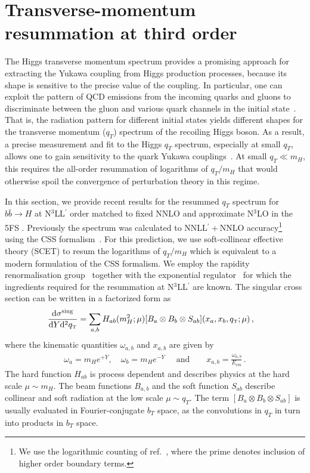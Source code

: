 \documentclass[11pt,a4paper]{article}
\begin{document}
\section{Transverse-momentum resummation at third order}
\label{sec:resummation}
The Higgs transverse momentum spectrum provides a promising approach for extracting the Yukawa coupling from Higgs production processes, because its shape is sensitive to the precise value of the coupling.
In particular, one can exploit the pattern of QCD emissions from the incoming quarks and gluons to discriminate between the gluon and various quark channels in the initial state~\cite{Ebert:2016idf}.
That is, the radiation pattern for different initial states yields different shapes for the transverse momentum ($q_T$) spectrum of the recoiling Higgs boson. As a result, a precise measurement and fit to the Higgs $q_T$ spectrum, especially at small $q_T$, allows one to gain sensitivity to the quark Yukawa couplings~\cite{Bishara:2016jga, Soreq:2016rae}.
At small $q_T \ll m_H$,
this requires the all-order resummation of logarithms of $q_T/m_H$ that would
otherwise spoil the convergence of perturbation theory in this regime.

In this section, we provide recent results for the resummed $q_T$ spectrum for $b\bar{b}\to H$ at N$^3$LL$^{\prime}$ order matched to fixed NNLO and approximate N$^3$LO in the 5FS \cite{Cal:2023mib}. Previously the spectrum was calculated to NNLL$^{\prime}+$NNLO accuracy\footnote{We use the logarithmic counting of ref.~\cite{Berger:2010xi}, where the prime denotes inclusion of higher order boundary terms.} ~\cite{Harlander:2014hya} using the CSS formalism~\cite{Collins:1981uk,Collins:1981va, Collins:1984kg}. For this prediction, we use soft-collinear effective theory (SCET)
\cite{Bauer:2000yr,Bauer:2001ct,Bauer:2001yt,Bauer:2002nz,Beneke:2002ph} to resum the logarithms of $q_T/m_H$ which is equivalent to a modern formulation of the CSS formalism.
We employ the rapidity
renormalisation group~\cite{Chiu:2012ir} together with the
exponential regulator~\cite{Li:2016axz} for which the ingredients
required for the resummation at N$^3$LL$^{\prime}$ are known.
The singular cross section can be written in a factorized form as
\begin{align} \label{tmd_factorization}
\frac{\mathrm{d} \sigma^\mathrm{sing}}{\mathrm{d} Y \mathrm{d}^2 \qt}
&= \sum_{a,b} H_{ab}(m_H^2; \mu) [B_a\otimes  B_b \otimes S_{ab}]( x_a, x_b, \qt; \mu)
\,,\end{align}
where the kinematic quantities $\omega_{a,b}$ and $x_{a,b}$ are given by
\begin{align}
\omega_{a}=m_H e^{+ Y}, \quad \omega_{b}=m_H e^{-Y} \quad \text{ and} \quad \quad x_{a,b}= \frac{\omega_{a,b}}{E_{cm}}
\,.\end{align}
The hard function $H_{ab}$ is process dependent and describes physics at the hard scale $\mu\sim m_H$. The beam functions $B_{a,b}$ and the soft function $S_{ab}$ describe collinear and soft radiation at the low scale $\mu \sim q_T$. 
The term $[B_a\otimes  B_b \otimes S_{ab}]$ is usually evaluated in Fourier-conjugate $b_T$ space, as the convolutions in $q_T$ in
 turn into products in $b_T$ space.
\end{document}
